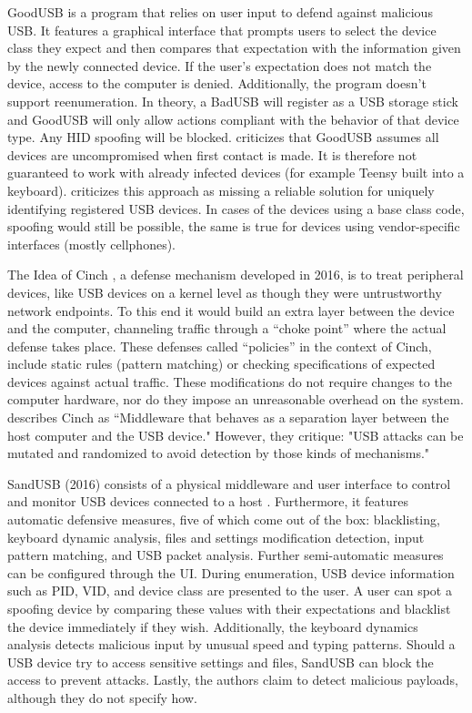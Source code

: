 GoodUSB \cite{tianDefendingMaliciousUSB2015} is a program that relies on user input to defend against malicious USB. It features a graphical interface that prompts users to select the device class they expect and then compares that expectation with the information given by the newly connected device. If the user's expectation does not match the device, access to the computer is denied. Additionally, the program doesn't support reenumeration. In theory, a BadUSB will register as a USB storage stick and GoodUSB will only allow actions compliant with the behavior of that device type. Any HID spoofing will be blocked. 
\cite{nissimUSBbasedAttacks2017} criticizes that GoodUSB assumes all devices are uncompromised when first contact is made. It is therefore not guaranteed to work with already infected devices (for example Teensy built into a keyboard). 
\cite{mohammadmoradiMakingWhitelistingBasedDefense2018} criticizes this approach as missing a reliable solution for uniquely identifying registered USB devices. In cases of the devices using a base class code, spoofing would still be possible, the same is true for devices using vendor-specific interfaces (mostly cellphones). 

The Idea of Cinch \cite{angelDefendingMaliciousPeripherals2016}, a defense mechanism developed in 2016, is to treat peripheral devices, like USB devices on a kernel level as though they were untrustworthy network endpoints. To this end it would build an extra layer between the device and the computer, channeling traffic through a ``choke point'' where the actual defense takes place. These defenses called ``policies'' in the context of Cinch, include static rules (pattern matching) or checking specifications of expected devices against actual traffic. 
These modifications do not require changes to the computer hardware, nor do they impose an unreasonable overhead on the system.
\cite{farhiMalboardNovelUser2019} describes Cinch as ``Middleware that behaves as a separation layer between the host computer and the USB device." However, they critique: "USB attacks can be mutated and randomized to avoid detection by those kinds of mechanisms." \cite[p.~7]{farhiMalboardNovelUser2019}

SandUSB (2016) consists of a physical middleware and user interface to control and monitor USB devices connected to a host \cite{loeSandUSBInstallationfreeSandbox2016}. Furthermore, it features automatic defensive measures, five of which come out of the box: blacklisting, keyboard dynamic analysis, files and settings modification detection, input pattern matching, and USB packet analysis. Further semi-automatic measures can be configured through the UI. 
During enumeration, USB device information such as PID, VID, and device class are presented to the user. A user can spot a spoofing device by comparing these values with their expectations and blacklist the device immediately if they wish.
Additionally, the keyboard dynamics analysis detects malicious input by unusual speed and typing patterns. Should a USB device try to access sensitive settings and files, SandUSB can block the access to prevent attacks. Lastly, the authors claim to detect malicious payloads, although they do not specify how. 

